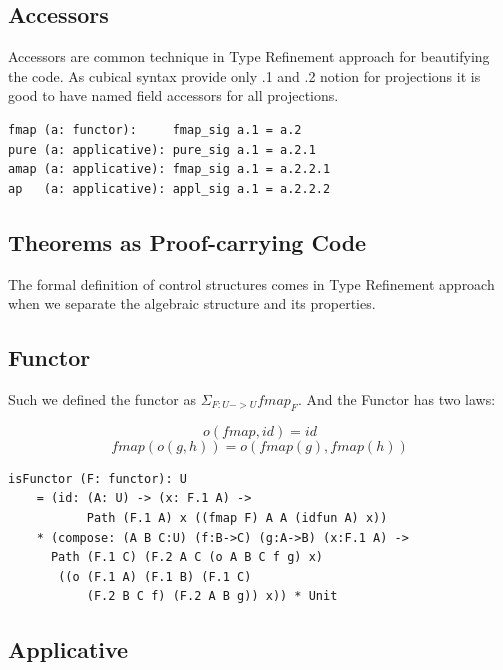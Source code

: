 \documentclass{article}
\begin{document}
\subsection{Accessors}

Accessors are common technique in Type Refinement approach for beautifying the code.
As cubical syntax provide only .1 and .2 notion for projections it is good to have
named field accessors for all projections.

\begin{lstlisting}[mathescape=true]
fmap (a: functor):     fmap_sig a.1 = a.2
pure (a: applicative): pure_sig a.1 = a.2.1
amap (a: applicative): fmap_sig a.1 = a.2.2.1
ap   (a: applicative): appl_sig a.1 = a.2.2.2
\end{lstlisting}

\subsection{Theorems as Proof-carrying Code}

The formal definition of control structures comes in Type Refinement approach when
we separate the algebraic structure and its properties.

\subsection*{Functor}

Such we defined the functor as $\Sigma_{F:U->U} fmap_F$. And the Functor has two laws:

\begin{equation} o(fmap,id) = id \end{equation}
\begin{equation} fmap(o(g,h)) = o(fmap(g),fmap(h)) \end{equation}

\begin{lstlisting}[mathescape=true]
isFunctor (F: functor): U
    = (id: (A: U) -> (x: F.1 A) ->
           Path (F.1 A) x ((fmap F) A A (idfun A) x))
    * (compose: (A B C:U) (f:B->C) (g:A->B) (x:F.1 A) ->
      Path (F.1 C) (F.2 A C (o A B C f g) x)
       ((o (F.1 A) (F.1 B) (F.1 C)
           (F.2 B C f) (F.2 A B g)) x)) * Unit
\end{lstlisting}

\newpage
\subsection*{Applicative}
\end{document}
